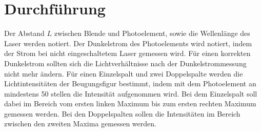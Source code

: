 
\section{Durchführung}
\label{sec:Durchführung}

Der Abstand $L$ zwischen Blende und Photoelement, sowie die Wellenlänge des Laser werden notiert. Der Dunkelstrom des Photoelements wird notiert, indem der Strom bei nicht eingeschaltetem Laser gemessen wird. Für einen korrekten Dunkelstrom sollten sich die Lichtverhältnisse nach der Dunkelstrommessung nicht mehr ändern. Für einen Einzelspalt und zwei Doppelspalte werden die Lichtintensitäten der Beugungsfigur bestimmt, indem mit dem Photoelement an mindestens 50 stellen die Intensität aufgenommen wird. Bei dem Einzelspalt soll dabei im Bereich vom ersten linken Maximum bis zum ersten rechten Maximum gemessen werden. Bei den Doppelspalten sollen die Intensitäten im Bereich zwischen den zweiten Maxima gemessen werden. 
